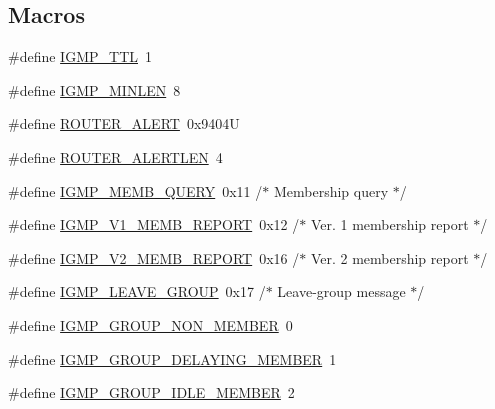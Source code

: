 \subsection*{Macros}
\begin{DoxyCompactItemize}
\item 
\#define \hyperlink{openmote-cc2538_2lwip_2src_2include_2lwip_2prot_2igmp_8h_a6ff76a6f7654b21a70e216151c97a869}{I\+G\+M\+P\+\_\+\+T\+TL}~1
\item 
\#define \hyperlink{openmote-cc2538_2lwip_2src_2include_2lwip_2prot_2igmp_8h_ad91c1a732326c16656dc7059f807acfd}{I\+G\+M\+P\+\_\+\+M\+I\+N\+L\+EN}~8
\item 
\#define \hyperlink{openmote-cc2538_2lwip_2src_2include_2lwip_2prot_2igmp_8h_a0b0944c1c4f2a64c79831d18f7d31802}{R\+O\+U\+T\+E\+R\+\_\+\+A\+L\+E\+RT}~0x9404U
\item 
\#define \hyperlink{openmote-cc2538_2lwip_2src_2include_2lwip_2prot_2igmp_8h_aa4bce84f942c375b780404c56f0ed51c}{R\+O\+U\+T\+E\+R\+\_\+\+A\+L\+E\+R\+T\+L\+EN}~4
\item 
\#define \hyperlink{openmote-cc2538_2lwip_2src_2include_2lwip_2prot_2igmp_8h_a0f85ab43aac98cc525c4d21b45bb08c9}{I\+G\+M\+P\+\_\+\+M\+E\+M\+B\+\_\+\+Q\+U\+E\+RY}~0x11 /$\ast$ Membership query         $\ast$/
\item 
\#define \hyperlink{openmote-cc2538_2lwip_2src_2include_2lwip_2prot_2igmp_8h_a7a18745c2691de97a594257e8588957e}{I\+G\+M\+P\+\_\+\+V1\+\_\+\+M\+E\+M\+B\+\_\+\+R\+E\+P\+O\+RT}~0x12 /$\ast$ Ver. 1 membership report $\ast$/
\item 
\#define \hyperlink{openmote-cc2538_2lwip_2src_2include_2lwip_2prot_2igmp_8h_a26b6b8b5dc43098b16d417a29b31a9e0}{I\+G\+M\+P\+\_\+\+V2\+\_\+\+M\+E\+M\+B\+\_\+\+R\+E\+P\+O\+RT}~0x16 /$\ast$ Ver. 2 membership report $\ast$/
\item 
\#define \hyperlink{openmote-cc2538_2lwip_2src_2include_2lwip_2prot_2igmp_8h_a4d87457009ed27ade2309cebe7a1dfcf}{I\+G\+M\+P\+\_\+\+L\+E\+A\+V\+E\+\_\+\+G\+R\+O\+UP}~0x17 /$\ast$ Leave-\/group message      $\ast$/
\item 
\#define \hyperlink{openmote-cc2538_2lwip_2src_2include_2lwip_2prot_2igmp_8h_a0357ddf34e5e88adaa654ad562adab54}{I\+G\+M\+P\+\_\+\+G\+R\+O\+U\+P\+\_\+\+N\+O\+N\+\_\+\+M\+E\+M\+B\+ER}~0
\item 
\#define \hyperlink{openmote-cc2538_2lwip_2src_2include_2lwip_2prot_2igmp_8h_a9c2129b3fb6f212eac44192ced19d33d}{I\+G\+M\+P\+\_\+\+G\+R\+O\+U\+P\+\_\+\+D\+E\+L\+A\+Y\+I\+N\+G\+\_\+\+M\+E\+M\+B\+ER}~1
\item 
\#define \hyperlink{openmote-cc2538_2lwip_2src_2include_2lwip_2prot_2igmp_8h_a5b9419fe533da22ca7015cac97e8b1e3}{I\+G\+M\+P\+\_\+\+G\+R\+O\+U\+P\+\_\+\+I\+D\+L\+E\+\_\+\+M\+E\+M\+B\+ER}~2
\end{DoxyCompactItemize}
